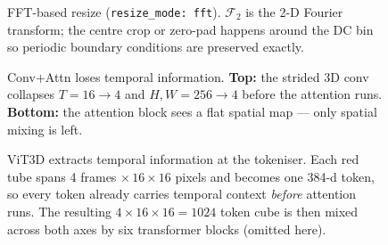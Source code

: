 \documentclass[11pt]{article}
\newcommand{\code}[1]{\texttt{#1}}
\begin{document}
\begin{figure}[h]
\centering

\caption{FFT-based resize (\code{resize\_mode: fft}). $\mathcal{F}_2$ is
  the 2-D Fourier transform; the centre crop or zero-pad happens around
  the DC bin so periodic boundary conditions are preserved exactly.}
\label{fig:fft-pipeline}
\end{figure}

\begin{figure}[h]
\centering

\caption{Conv$+$Attn loses temporal information. \textbf{Top:} the
  strided 3D conv collapses $T{=}16{\to}4$ and $H,W{=}256{\to}4$
  before the attention runs. \textbf{Bottom:} the attention block
  sees a flat spatial map — only spatial mixing is left.}
\label{fig:conv-attn}
\end{figure}

\begin{figure}[h]
\centering

\caption{ViT3D extracts temporal information at the tokeniser. Each
  red tube spans 4 frames $\times\,16{\times}16$ pixels and becomes
  one 384-d token, so every token already carries temporal context
  \emph{before} attention runs. The resulting $4{\times}16{\times}16
  {=}1024$ token cube is then mixed across both axes by six
  transformer blocks (omitted here).}
\label{fig:vit3d}
\end{figure}
\end{document}
